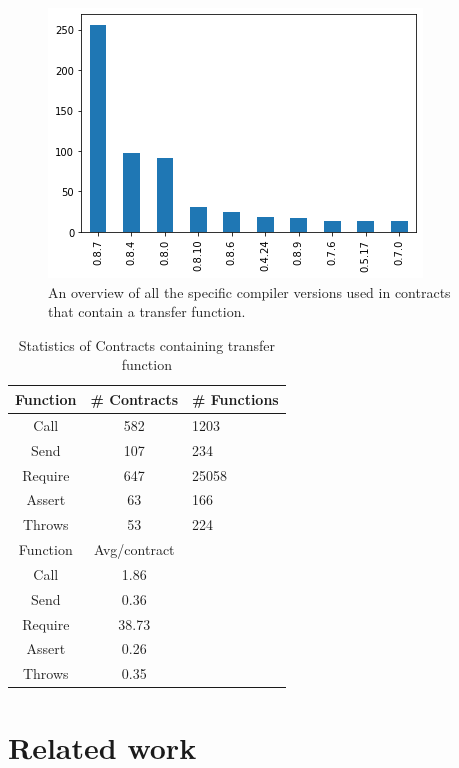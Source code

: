 \documentclass[10pt,conference]{IEEEtran}
\begin{document}
\begin{figure}[h]
  \centering
  \includegraphics[width=\linewidth]{img/transfer_versions_clean.png}
  \caption{An overview of all the specific compiler versions used in contracts that contain a transfer function. }
  \label{fig:transfer_version}
\end{figure}


\begin{table}
  \caption{Statistics of Contracts containing transfer function}
  \label{tab:transfer}
  \begin{tabular}{ccl}
    \hline
    Function & \# Contracts & \# Functions\\
    \hline
    Call&582&1203\\
    Send&107&234\\
    Require&647&25058\\
    Assert&63&166\\
    Throws&53&224\\
    \hline
    Function & Avg/contract\\
    \hline
    Call&1.86\\
    Send&0.36\\
    Require&38.73\\
    Assert&0.26\\
    Throws&0.35\\
  \hline
\end{tabular}
\end{table}


\section{Related work}
\end{document}
